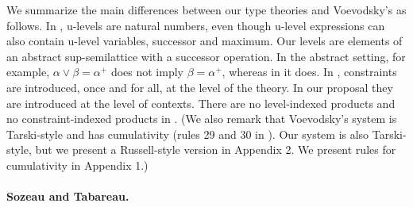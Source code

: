 \documentclass[11pt,a4paper]{article}
\theoremstyle{definition}
\begin{document}
We summarize the main differences between our type theories
and Voevodsky's as follows.
%
In \cite{VV}, u-levels are natural numbers, even though u-level
expressions can also contain u-level variables, successor and maximum.
Our levels are elements of an abstract sup-semilattice with a successor
operation. In the abstract setting, for example,
$\alpha\vee\beta=\alpha^+$ does not imply $\beta=\alpha^+$,
whereas in \cite{VV} it does.
%
In \cite{VV}, constraints are introduced, once and for all,
at the level of the theory. In our proposal they are introduced
at the level of contexts.
There are no level-indexed products and no constraint-indexed products in \cite{VV}.
%
%
(We also remark that Voevodsky's system is Tarski-style and has cumulativity (rules 29 and 30 in \cite[Section 3.4]{VV}). Our system is also Tarski-style, but we present a Russell-style version in Appendix 2. We present rules for cumulativity in Appendix 1.)





\paragraph{Sozeau and Tabareau.}
\end{document}
